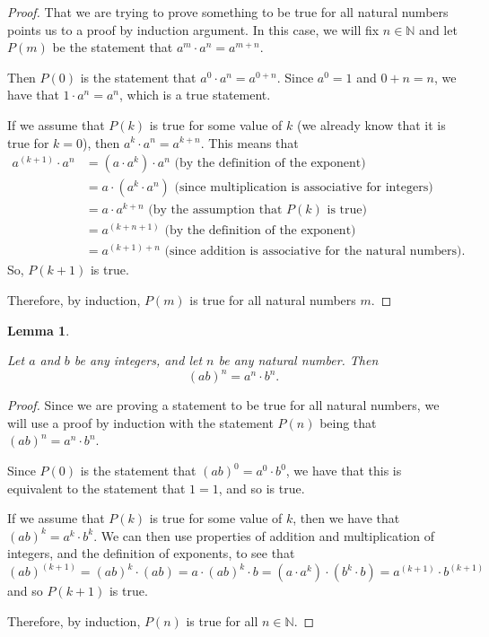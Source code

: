 \documentclass[
]{book}
\newtheorem{lemma}{Lemma}[chapter]
\theoremstyle{definition}
\theoremstyle{definition}
\theoremstyle{definition}
\theoremstyle{definition}
\theoremstyle{remark}
\begin{document}
\begin{proof}

That we are trying to prove something to be true for all natural numbers points us to a proof by induction argument. In this case, we will fix \(n\in \mathbb{N}\) and let \(P(m)\) be the statement that \(a^m\cdot a^n=a^{m+n}\).

Then \(P(0)\) is the statement that \(a^0\cdot a^n = a^{0+n}\). Since \(a^0=1\) and \(0+n=n\), we have that \(1\cdot a^n = a^n\), which is a true statement.

If we assume that \(P(k)\) is true for some value of \(k\) (we already know that it is true for \(k=0\)), then \(a^k\cdot a^n = a^{k+n}\). This means that
\begin{align*}
    a^{(k+1)} \cdot a^n & = (a \cdot a^k) \cdot a^n \mbox{ (by the definition of the exponent)} \\
    &= a \cdot (a^k\cdot a^n) \mbox{ (since multiplication is associative for integers)} \\
    &= a \cdot a^{k+n} \mbox{ (by the assumption that $P(k)$ is true)} \\
    &= a^{(k+n+1)} \mbox{ (by the definition of the exponent)} \\
    &= a^{(k+1)+n} \mbox{ (since addition is associative for the natural numbers)}.
\end{align*}
So, \(P(k+1)\) is true.

Therefore, by induction, \(P(m)\) is true for all natural numbers \(m\).

\end{proof}

\begin{lemma}
\protect\hypertarget{lem:unlabeled-div-34}{}\label{lem:unlabeled-div-34}

Let \(a\) and \(b\) be any integers, and let \(n\) be any natural number. Then \[(ab)^n=a^n \cdot b^n.\]

\end{lemma}

\begin{proof}

Since we are proving a statement to be true for all natural numbers, we will use a proof by induction with the statement \(P(n)\) being that \((ab)^n=a^n\cdot b^n\).

Since \(P(0)\) is the statement that \((ab)^0=a^0 \cdot b^0\), we have that this is equivalent to the statement that \(1=1\), and so is true.

If we assume that \(P(k)\) is true for some value of \(k\), then we have that \((ab)^k=a^k\cdot b^k\). We can then use properties of addition and multiplication of integers, and the definition of exponents, to see that \[(ab)^{(k+1)}= (ab)^k\cdot (ab) = a\cdot (ab)^k \cdot b = (a\cdot a^k) \cdot (b^k\cdot b)  = a^{(k+1)} \cdot b^{(k+1)}\] and so \(P(k+1)\) is true.

Therefore, by induction, \(P(n)\) is true for all \(n\in \mathbb{N}\).

\end{proof}
\end{document}
